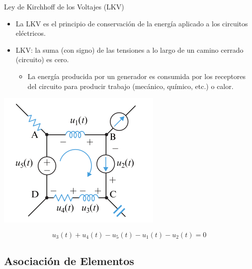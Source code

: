 \documentclass[xcolor={usenames,svgnames,dvipsnames}]{beamer}
\begin{document}
\begin{frame}[label={sec:orgd6469af}]{Ley de Kirchhoff de los Voltajes (LKV)}
\begin{itemize}
\item La \alert{LKV} es el principio de conservación de la energía aplicado a los circuitos eléctricos.

\item \alert{LKV}: la suma (con signo) de las tensiones a lo largo de un camino cerrado (circuito) es cero.

\begin{itemize}
\item La energía producida por un generador es consumida por los receptores del circuito para producir trabajo (mecánico, químico, etc.) o calor.
\end{itemize}
\end{itemize}

\begin{center}
\includegraphics[height=0.4\textheight]{figs/LKV_FM.pdf}
\end{center}
\[
u_3(t) + u_4 (t) - u_5 (t) - u_1 (t) - u_2 (t)  = 0
\]
\end{frame}

\subsection{Asociación de Elementos}
\label{sec:orgd8864f4}
\end{document}
